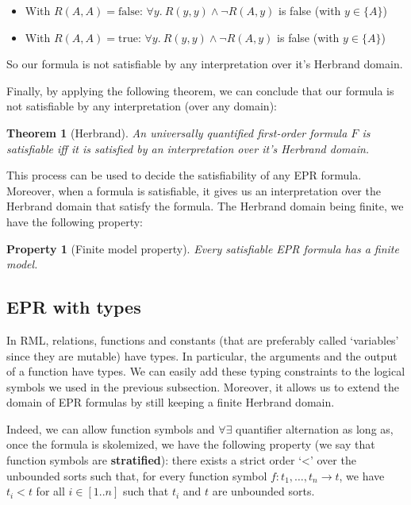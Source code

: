 \documentclass[11pt,a4paper,oldfontcommands,openany]{memoir}
\newtheorem*{theorem}{Theorem}
\newtheorem*{property}{Property}
\begin{document}
        \begin{itemize}
            \item With \(R(A,A)=\text{false}\): \(\forall y. \ R(y,y) \land \neg R(A,y)\) is false (with \( y \in \{A\} \))
            \item With \(R(A,A)=\text{true}\): \(\forall y. \ R(y,y) \land \neg R(A,y)\) is false (with \( y \in \{A\} \))
        \end{itemize}

        So our formula is not satisfiable by any interpretation over it's Herbrand domain.

        Finally, by applying the following theorem, we can conclude that our formula is not satisfiable by any interpretation (over any domain):
        \begin{theorem}[Herbrand]
            An universally quantified first-order formula \(F\) is satisfiable iff it is satisfied by an interpretation over it's Herbrand domain.
        \end{theorem}

        This process can be used to decide the satisfiability of any EPR formula. Moreover, when a formula is satisfiable,
        it gives us an interpretation over the Herbrand domain that satisfy the formula.
        The Herbrand domain being finite, we have the following property:

        \begin{property}[Finite model property]
            Every satisfiable EPR formula has a finite model.
        \end{property}

        \subsection{EPR with types}

        In RML, relations, functions and constants (that are preferably called `variables' since they are mutable) have types.
        In particular, the arguments and the output of a function have types.
        We can easily add these typing constraints to the logical symbols we used in the previous subsection.
        Moreover, it allows us to extend the domain of EPR formulas by still keeping a finite Herbrand domain.

        Indeed, we can allow function symbols and \(\forall\exists\) quantifier alternation as long as,
        once the formula is skolemized, we have the following property (we say that function symbols are \textbf{stratified}):
        there exists a strict order `<' over the unbounded sorts such that,
        for every function symbol \( f: t_1,\ldots,t_n \to t \), we have \( t_i < t \) for all \(i \in [1..n]\) such that \(t_i\) and \(t\)
        are unbounded sorts. 
\end{document}
